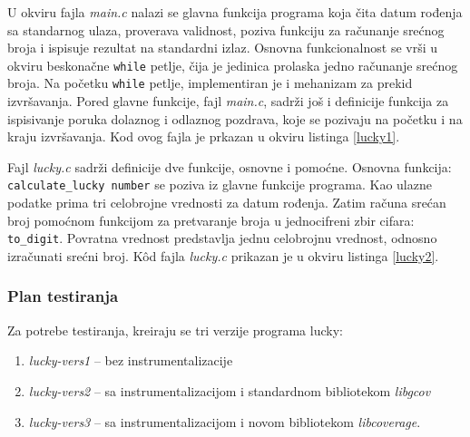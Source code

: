 \documentclass[12pt,oneside]{memoir}
\newcommand{\kod}[1]{\texttt{#1}}
\newcommand{\strano}[1]{\textit{#1}}
\begin{document}
U okviru fajla \strano{main.c} nalazi se glavna funkcija programa koja čita datum rođenja sa standarnog ulaza, proverava validnost, poziva funkciju za računanje srećnog broja i ispisuje rezultat na standardni izlaz. Osnovna funkcionalnost se vrši u okviru beskonačne \kod{while} petlje, čija je jedinica prolaska jedno računanje srećnog broja. Na početku \kod{while} petlje, implementiran je i mehanizam za prekid izvršavanja. Pored glavne funkcije, fajl \strano{main.c}, sadrži još i definicije funkcija za ispisivanje poruka dolaznog i odlaznog pozdrava, koje se pozivaju na početku i na kraju izvršavanja. Kod ovog fajla je prkazan u okviru listinga \ref{lucky1}.

Fajl \strano{lucky.c} sadrži definicije dve funkcije, osnovne i pomoćne. Osnovna funkcija: \kod{calculate\_lucky\ number} se poziva iz glavne funkcije programa. Kao ulazne podatke prima tri celobrojne vrednosti za datum rođenja. Zatim računa srećan broj pomoćnom funkcijom za pretvaranje broja u jednocifreni zbir cifara: \kod{to\_digit}. Povratna vrednost predstavlja jednu celobrojnu vrednost, odnosno izračunati srećni broj. K\^{o}d fajla \strano{lucky.c} prikazan je u okviru listinga \ref{lucky2}.
\\
\subsubsection{Plan testiranja}

Za potrebe testiranja, kreiraju se tri verzije programa lucky:
\begin{enumerate}
\item \strano{lucky-vers1} – bez instrumentalizacije
\item \strano{lucky-vers2} – sa instrumentalizacijom i standardnom bibliotekom \strano{libgcov}
\item \strano{lucky-vers3} – sa instrumentalizacijom i novom bibliotekom \strano{libcoverage}. 
\end{enumerate}
\end{document}
